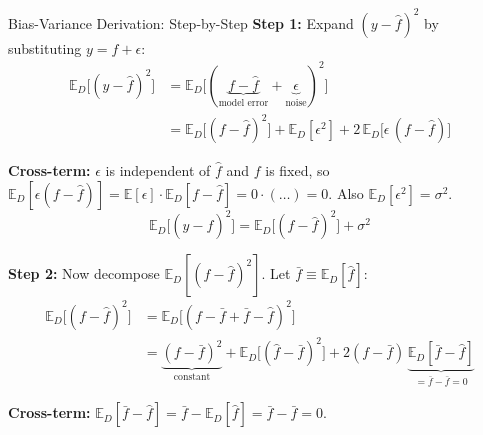 \documentclass[aspectratio=169, 10pt]{beamer}
\newcommand{\E}{\mathbb{E}}
\newcommand{\fhat}{\hat{f}}
\begin{document}
\begin{frame}{Bias-Variance Derivation: Step-by-Step}
  \textbf{Step 1:} Expand $(y - \fhat)^2$ by substituting $y = f + \epsilon$:
  \pause
  \begin{align*}
    \E_D\bigl[(y - \fhat)^2\bigr]
    &= \E_D\bigl[(\underbrace{f - \fhat}_{\text{model error}} + \underbrace{\epsilon}_{\text{noise}})^2\bigr] \\
    &= \E_D\bigl[(f - \fhat)^2\bigr]
       + \E_D[\epsilon^2]
       + 2\,\E_D\bigl[\epsilon\,(f - \fhat)\bigr]
  \end{align*}

  \pause
  {\small \textbf{Cross-term:} $\epsilon$ is independent of $\fhat$ and $f$ is fixed,
  so $\E_D[\epsilon(f-\fhat)] = \E[\epsilon]\cdot\E_D[f-\fhat] = 0 \cdot (\ldots) = 0$.
  Also $\E_D[\epsilon^2]=\sigma^2$.}
  \[
    \boxed{\E_D\bigl[(y - \fhat)^2\bigr] = \E_D\bigl[(f - \fhat)^2\bigr] + \sigma^2}
  \]

  \pause
  \vspace{0.3em}
  \textbf{Step 2:} Now decompose $\E_D[(f-\fhat)^2]$. Let $\bar{f} \equiv \E_D[\fhat]$:
  \begin{align*}
    \E_D\bigl[(f-\fhat)^2\bigr]
    &= \E_D\bigl[(f - \bar{f} + \bar{f} - \fhat)^2\bigr] \\
    &= \underbrace{(f - \bar{f})^2}_{\text{constant}} + \E_D\bigl[(\fhat - \bar{f})^2\bigr]
       + 2(f-\bar{f})\,\underbrace{\E_D[\bar{f} - \fhat]}_{= \bar{f} - \bar{f} = 0}
  \end{align*}

  {\small \textbf{Cross-term:} $\E_D[\bar{f}-\fhat] = \bar{f} - \E_D[\fhat] = \bar{f} - \bar{f} = 0$.}

\end{frame}
\end{document}
